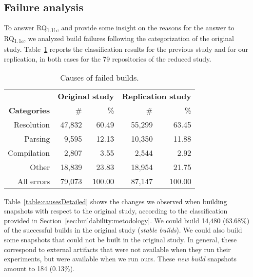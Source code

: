 \subsection{Failure analysis}

To answer RQ\textsubscript{1.1b}, and provide some insight on the reasons for the answer to RQ\textsubscript{1.1c}, we analyzed build failures following the categorization of the original study. Table~\ref{table:allCauses} reports the classification results for the previous study and for our replication, in both cases for the 79 repositories of the reduced study.

\begin{table}[h]
\caption{Causes of failed builds.}
\label{table:allCauses}
\begin{center}
\begin{tabular*}{\textwidth}{@{\extracolsep{\fill}}rrrrr}
\toprule
\multicolumn{1}{l}{}	    & \multicolumn{2}{c}{\bf{Original study}}    & \multicolumn{2}{c}{\bf{Replication study}}  \\
\bf{Categories}                 & \multicolumn{1}{r}{\#} & \multicolumn{1}{r}{\%} & \multicolumn{1}{r}{\#} & \multicolumn{1}{r}{\%}  \\
\midrule
Resolution  & 47,832 &  60.49 & 55,299 & 63.45  \\
Parsing     &  9,595 &  12.13 & 10,350 & 11.88  \\
Compilation &  2,807 &   3.55 &  2,544 &  2.92  \\
Other       & 18,839 &  23.83 & 18,954 & 21.75  \\
\midrule
All errors & 79,073 & 100.00 & 87,147 & 100.00 \\
\bottomrule
\end{tabular*}
\end{center}
\end{table}

Table~\ref{table:causesDetailed} shows the changes we observed when building snapshots with respect to the original study, according to the classification provided in Section~\ref{sec:buildability:metodology}. We could build 14,480 (63.68\%) of the successful builds in the original study (\textit{stable builds}). We could also build some snapshots that could not be built in the original study. In general, these correspond to external artifacts that were not available when they run their experiments, but were available when we run ours. These \emph{new build} snapshots amount to 184 (0.13\%).

